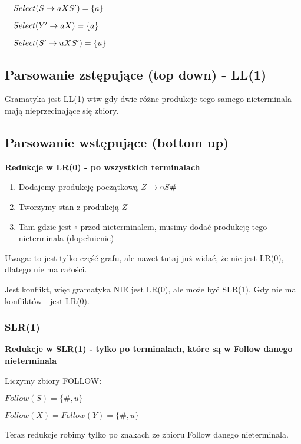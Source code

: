 $\quad Select(S \rightarrow aXS') = \{ a \}$

$\quad Select(Y' \rightarrow aX) = \{ a \}$

$\quad Select(S' \rightarrow uXS') = \{ u \}$

\subsection{Parsowanie zstępujące (top down) - LL(1)}
Gramatyka jest LL(1) wtw gdy dwie różne produkcje tego samego nieterminala mają nieprzecinające się zbiory.

\subsection{Parsowanie wstępujące (bottom up)}

\textbf{Redukcje w LR(0) - po wszystkich terminalach}
\begingroup
\begin{enumerate}
    \small
    \setlength{\itemsep}{1pt}
    \setlength{\parskip}{0pt}
    \setlength{\parsep}{0pt}
    \item Dodajemy produkcję początkową $Z \rightarrow \circ S\#$
    \item Tworzymy stan z produkcją $Z$
    \item Tam gdzie jest $\circ$ przed nieterminalem, musimy dodać produkcję tego nieterminala (dopełnienie)
\end{enumerate}
\footnotesize{Uwaga: to jest tylko część grafu, ale nawet tutaj już widać, że nie jest LR(0), dlatego nie ma całości.}
\begin{figure}[H]

\end{figure}

\small Jest konflikt, więc gramatyka NIE jest LR(0), ale może być SLR(1). Gdy nie ma konfliktów - jest LR(0).
\endgroup

\subsubsection{SLR(1)}

\textbf{Redukcje w SLR(1) - tylko po terminalach, które są w Follow danego nieterminala}

Liczymy zbiory FOLLOW:

$Follow(S) = \{\#, u\}$

$Follow(X) = Follow(Y) = \{\#, u\}$

Teraz redukcje robimy tylko po znakach ze zbioru Follow danego nieterminala.

\begin{figure}[H]

\end{figure}

